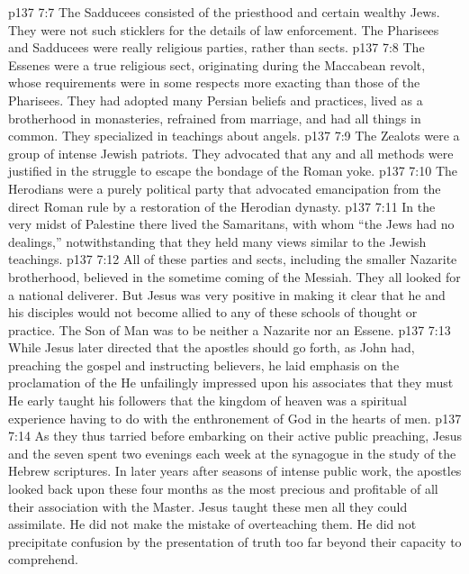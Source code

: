 \vs p137 7:7 \pc The Sadducees consisted of the priesthood and certain wealthy Jews. They were not such sticklers for the details of law enforcement. The Pharisees and Sadducees were really religious parties, rather than sects.
\vs p137 7:8 \pc The Essenes were a true religious sect, originating during the Maccabean revolt, whose requirements were in some respects more exacting than those of the Pharisees. They had adopted many Persian beliefs and practices, lived as a brotherhood in monasteries, refrained from marriage, and had all things in common. They specialized in teachings about angels.
\vs p137 7:9 \pc The Zealots were a group of intense Jewish patriots. They advocated that any and all methods were justified in the struggle to escape the bondage of the Roman yoke.
\vs p137 7:10 \pc The Herodians were a purely political party that advocated emancipation from the direct Roman rule by a restoration of the Herodian dynasty.
\vs p137 7:11 \pc In the very midst of Palestine there lived the Samaritans, with whom “the Jews had no dealings,” notwithstanding that they held many views similar to the Jewish teachings.
\vs p137 7:12 \pc All of these parties and sects, including the smaller Nazarite brotherhood, believed in the sometime coming of the Messiah. They all looked for a national deliverer. But Jesus was very positive in making it clear that he and his disciples would not become allied to any of these schools of thought or practice. The Son of Man was to be neither a Nazarite nor an Essene.
\vs p137 7:13 While Jesus later directed that the apostles should go forth, as John had, preaching the gospel and instructing believers, he laid emphasis on the proclamation of the  He unfailingly impressed upon his associates that they must  He early taught his followers that the kingdom of heaven was a spiritual experience having to do with the enthronement of God in the hearts of men.
\vs p137 7:14 As they thus tarried before embarking on their active public preaching, Jesus and the seven spent two evenings each week at the synagogue in the study of the Hebrew scriptures. In later years after seasons of intense public work, the apostles looked back upon these four months as the most precious and profitable of all their association with the Master. Jesus taught these men all they could assimilate. He did not make the mistake of overteaching them. He did not precipitate confusion by the presentation of truth too far beyond their capacity to comprehend.
